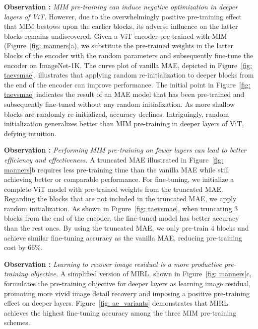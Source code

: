 \documentclass{article}
\begin{document}
\textbf{Observation \uppercase\expandafter{}:} \textit{MIM pre-training can induce negative optimization in deeper layers of ViT.}
However, due to the overwhelmingly positive pre-training effect that MIM bestows upon the earlier blocks, its adverse influence on the latter blocks remains undiscovered.
Given a ViT encoder pre-trained with MIM (Figure~\ref{fig: manners}a), we substitute the pre-trained weights in the latter blocks of the encoder with the random parameters and subsequently fine-tune the encoder on ImageNet-1K.
The curve plot of vanilla MAE, depicted in Figure~\ref{fig: taevsmae}, illustrates that applying random re-initialization to deeper blocks from the end of the encoder can improve performance. 
The initial point in Figure~\ref{fig: taevsmae} indicates the result of an MAE model that has been pre-trained and subsequently fine-tuned without any random initialization. As more shallow blocks are randomly re-initialized, accuracy declines.
Intriguingly, random initialization generalizes better than MIM pre-training in deeper layers of ViT, defying intuition.


\textbf{Observation \uppercase\expandafter{}:} 
\textit{Performing MIM pre-training on fewer layers can lead to better efficiency and effectiveness.} A truncated MAE illustrated in Figure~\ref{fig: manners}b requires less pre-training time than the vanilla MAE while still achieving better or comparable performance. 
For fine-tuning, we initialize a complete ViT model with pre-trained weights from the truncated MAE. Regarding the blocks that are not included in the truncated MAE, we apply random initialization.
As shown in Figure~\ref{fig: taevsmae}, when truncating 3 blocks from the end of the encoder, the fine-tuned model has better accuracy than the rest ones.  
By using the truncated MAE, we only pre-train 4 blocks and achieve similar fine-tuning accuracy as the vanilla MAE, reducing pre-training cost by 66\%.


\textbf{Observation \uppercase\expandafter{}:} \textit{Learning to recover image residual is a more productive pre-training objective.}
A simplified version of MIRL, shown in Figure~\ref{fig: manners}c, formulates the pre-training objective for deeper layers as learning image residual, promoting more vivid image detail recovery and imposing a positive pre-training effect on deeper layers. Figure~\ref{fig: ae_variants} demonstrates that MIRL achieves the highest fine-tuning accuracy among the three MIM pre-training schemes.
\end{document}
